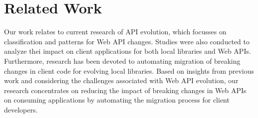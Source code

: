 \chapter{Related Work}
\label{ch:RelatedWork}

Our work relates to current research of API evolution, which focusses on classification and patterns for Web API changes. Studies were also conducted to analyze thei impact on client applications for both local libraries and Web APIs. Furthermore, research has been devoted to automating migration of breaking changes in client code for evolving local libraries. Based on insights from previous work and considering the challenges associated with Web API evolution, our research concentrates on reducing the impact of breaking changes in Web APIs on consuming applications by automating the migration process for client developers.



